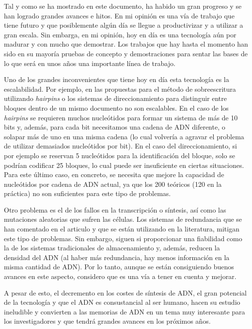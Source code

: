 \documentclass[a4paper,11pt]{article}
\begin{document}
Tal y como se ha mostrado en este documento, ha habido un gran progreso y se han logrado grandes avances e hitos. En mi opinión es una vía de trabajo que tiene futuro y que posiblemente algún día se llegue a productivizar y a utilizar a gran escala.
Sin embarga, en mi opinión, hoy en día es una tecnología aún por madurar y con mucho que demostrar. Los trabajos que hay hasta el momento han sido en su mayoría pruebas de concepto y demostraciones para sentar las bases de lo que será en unos años una importante línea de trabajo.

Uno de los grandes inconvenientes que tiene hoy en día esta tecnología es la escalabilidad. Por ejemplo, en las propuestas para el método de sobreescritura utilizando \textit{hairpins} o los sistemas de direccionamiento para distinguir entre bloques dentro de un mismo documento no son escalables. En el caso de los \textit{hairpins} se requieren muchos nucleótidos para formar un sistema de más de 10 bits y, además, para cada bit necesitamos una cadena de ADN diferente, o solapar más de uno en una misma cadena (lo cual volvería a agravar el problema de utilizar demasiados nucleótidos por bit). En el caso del direccionamiento, si por ejemplo se reservan 5 nucleótidos para la identificación del bloque, solo se podrían codificar 25 bloques, lo cual puede ser insuficiente en ciertas situaciones. Para este último caso, en concreto, se necesita que mejore la capacidad de nucleótidos por cadena de ADN actual, ya que los 200 teóricos (120 en la práctica) no son suficientes para este tipo de problemas.

Otro problema es el de los fallos en la transcripción o síntesis, así como las mutaciones aleatorias que sufren las células. Los sistemas de redundancia que se han comentado en el articulo y que se están utilizando en la literatura, mitigan este tipo de problemas. Sin embargo, siguen si proporcionar una fiabilidad como la de los sistemas tradicionales de almacenamiento y, además, reducen la densidad del ADN (al haber más redundancia, hay menos información en la misma cantidad de ADN). Por lo tanto, aunque se están consiguiendo buenos avances en este aspecto, considero que es una vía a tener en cuenta y mejorar.

A pesar de esto, el decremento en los costes de síntesis de ADN, el gran potencial de la tecnología y que el ADN es consustancial al ser humano, hacen su estudio ineludible y convierten a las memorias de ADN en un tema muy interesante para los investigadores y que tendrá grandes avances en los próximos años.



\newpage

\printbibliography
\end{document}
